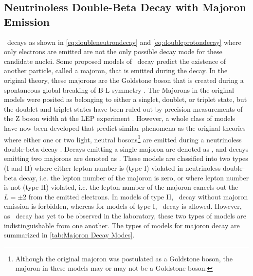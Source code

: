 \subsection{Neutrinoless Double-Beta Decay with Majoron Emission}
\label{ssec:Neutrinoless Double-Beta Decay with Majoron Emisison}
\zeronubb~decays as shown in \autoref{eq:doubleneutrondecay} and \autoref{eq:doubleprotondecay} where only electrons are emitted are not the only possible decay mode for these candidate nuclei.
Some proposed models of \zeronubb~decay predict the existence of another particle, called a majoron, that is emitted during the decay.
In the original theory, these majorons are the Goldstone boson that is created during a spontaneous global breaking of B-L symmetry \cite{CHIKASHIGE1981265}.
The Majorons in the original models were posited as belonging to either a singlet, doublet, or triplet state, but the doublet and triplet states have been ruled out by precision measurements of the Z boson width at the LEP experiment \cite{ALEPH:2005ab}.
However, a whole class of models have now been developed that predict similar phenomena as the original theories where either one or two light, neutral bosons\footnote{Although the original majoron was postulated as a Goldstone boson, the majoron in these models may or may not be a Goldstone boson.}
are emitted during a neutrinoless double-beta decay \cite{HIRSCH19968}.
Decays emitting a single majoron are denoted as \zeronubbonechi, and decays emitting two majorons are denoted as \zeronubbtwochi.
These models are classified into two types (I and II) where either lepton number is (type I) violated in neutrinoless double-beta decay, i.e. the lepton number of the majoron is zero, or where lepton number is not (type II) violated, i.e. the lepton number of the majoron cancels out the $L=\pm2$ from the emitted electrons.
In models of type II, \zeronubb~decay without majoron emission is forbidden, whereas for models of type I, \zeronubb~decay is allowed.
However, as \zeronubb~decay has yet to be observed in the laboratory, these two types of models are indistinguishable from one another.
The types of models for majoron decay are summarized in \autoref{tab:Majoron Decay Modes}. 
